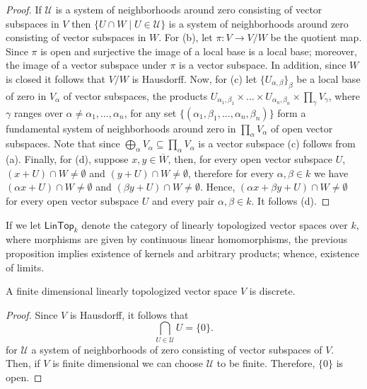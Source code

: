 \begin{proof}
	If $\mathscr{U}$ is a system of neighborhoods around zero consisting of vector subspaces in $V$ then $\{U\cap W\mid U \in \mathscr{U}\}$ is a system of neighborhoods around zero consisting of vector subspaces in $W$. For (b), let $\pi\colon V \to V/W$ be the quotient map. Since $\pi$ is open and surjective the image of a local base is a local base; moreover, the image of a vector subspace under $\pi$ is a vector subspace. In addition, since $W$ is closed it follows that $V/W$ is Hausdorff.  Now, for (c) let $\{U_{\alpha, \beta}\}_{\beta}$ be a local base of zero in $V_{\alpha}$ of vector subspaces, the products $U_{\alpha_{1}, \beta_{1}} \times \ldots \times U_{\alpha_{n}, \beta_{n}} \times \prod_{\gamma} V_{\gamma}$, where $\gamma$ ranges over $\alpha \neq \alpha_{1}, \ldots, \alpha_{n}$, for any set $\{(\alpha_{1}, \beta_{1}, \ldots, \alpha_{n}, \beta_{n})\}$ form a fundamental system of neighborhoods around zero in $\prod_{\alpha} V_{\alpha}$ of open vector subspaces. Note that since $\bigoplus_{\alpha} V_{\alpha} \subseteq \prod_{\alpha} V_{\alpha}$ is a vector subspace (c) follows from (a). Finally, for (d), suppose $x,y\in \overline{W}$, then, for every open vector subspace $U$, $(x + U)\cap W \neq \emptyset$ and $(y + U)\cap W \neq \emptyset$, therefore for every $\alpha, \beta \in k$ we have $(\alpha x + U)\cap W \neq \emptyset$ and $(\beta y + U)\cap W \neq \emptyset$. Hence, $(\alpha x + \beta y + U)\cap W\neq \emptyset$ for every open vector subspace $U$ and every pair $\alpha, \beta\in k$. It follows (d).
\end{proof}
\begin{proposition}\label{prop:limits-and-colimits-in-lintop-category}
	If we let $\mathsf{LinTop}_{k}$ denote the category of linearly topologized vector spaces over $k$, where morphisms are given by continuous linear homomorphisms, the previous proposition implies existence of kernels and arbitrary products; whence, existence of limits.  
\end{proposition}
\begin{proposition}\label{prop:finite_dimensional_linear_topologies}
A finite dimensional linearly topologized vector space $V$ is discrete.
\end{proposition}
\begin{proof}
	Since $V$ is Hausdorff, it follows that
	\[
		\bigcap_{U \in \mathscr{U}}U = \{0\}.
	\]
	for $\mathscr{U}$ a system of neighborhoods of zero consisting of vector subspaces of $V$. Then, if $V$ is finite dimensional we can choose $\mathscr{U}$ to be finite. Therefore, $\{0\}$ is open.
\end{proof}

